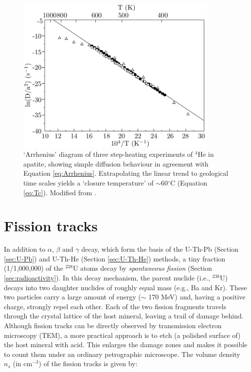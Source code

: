 \documentclass{book}
\newif\ifpdf
\begin{document}
\begin{figure}[!ht]
  \centering
  \ifpdf
  \def\svgwidth{.85\textwidth}
  
  \else
  \includegraphics[width=10cm]{Arrhenius.png}
  \fi
  \caption{`Arrhenius' diagram of three step-heating experiments of
    $^4$He in apatite, showing simple diffusion behaviour in agreement
    with Equation \ref{eq:Arrhenius}. Extrapolating the linear trend
    to geological time scales yields a `closure temperature' of
    $\sim$60$^\circ$C (Equation \ref{eq:Tc}). Modified from
    \citet{braun2006}.}
  \label{fig:Arrhenius}
\end{figure}

\section{Fission tracks}
\label{sec:fission-tracks}

In addition to $\alpha$, $\beta$ and $\gamma$ decay, which form the
basis of the U-Th-Pb (Section \ref{sec:U-Pb}) and U-Th-He (Section
\ref{sec:U-Th-He}) methods, a tiny fraction (1/1,000,000) of the
$^{238}$U atoms decay by \emph{spontaneous fission} (Section
\ref{sec:radioactivity}). In this decay mechanism, the parent nuclide
(i.e., $^{238}$U) decays into two daughter nuclides of roughly equal
mass (e.g., Ba and Kr). These two particles carry a large amount of
energy ($\sim$ 170 MeV) and, having a positive charge, strongly repel
each other. Each of the two fission fragments travels through the
crystal lattice of the host mineral, leaving a trail of damage
behind. Although fission tracks can be directly observed by
transmission electron microscopy (TEM), a more practical approach is
to etch (a polished surface of) the host mineral with acid. This
enlarges the damage zones and makes it possible to count them under an
ordinary petrographic microscope. The volume density $n_s$ (in
cm$^{-3}$) of the fission tracks is given by:
\end{document}
